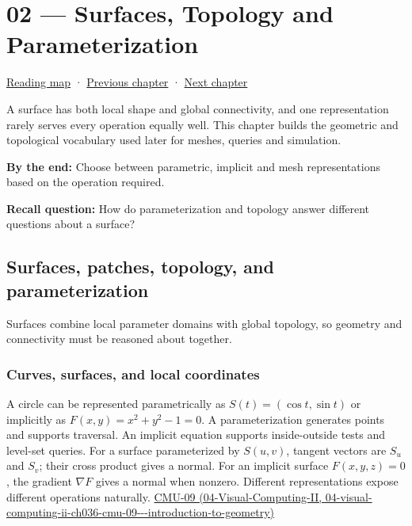 \hypertarget{03-visual-computing-i-ch002}{}
\chapter{02 --- Surfaces, Topology and Parameterization}\label{03-visual-computing-i-ch002-surfaces-topology-and-parameterization}

\hyperref[volume-reading-map]{Reading map} · \hyperref[03-visual-computing-i-ch001-from-worlds-to-images-and-inference]{Previous chapter} · \hyperref[03-visual-computing-i-ch003-lens-optics-and-image-formation]{Next chapter}

A surface has both local shape and global connectivity, and one representation rarely serves every operation equally well. This chapter builds the geometric and topological vocabulary used later for meshes, queries and simulation.

\textbf{By the end:} Choose between parametric, implicit and mesh representations based on the operation required.

\textbf{Recall question:} How do parameterization and topology answer different questions about a surface?

\section{Surfaces, patches, topology, and parameterization}\label{03-visual-computing-i-ch002-surfaces-patches-topology-and-parameterization}

Surfaces combine local parameter domains with global topology, so geometry and connectivity must be reasoned about together.

\subsection{Curves, surfaces, and local coordinates}\label{03-visual-computing-i-ch002-curves-surfaces-and-local-coordinates}

A circle can be represented parametrically as \(S(t)=(\cos t,\sin t)\) or implicitly as \(F(x,y)=x^2+y^2-1=0\). A parameterization generates points and supports traversal. An implicit equation supports inside-outside tests and level-set queries. For a surface parameterized by \(S(u,v)\), tangent vectors are \(S_u\) and \(S_v\); their cross product gives a normal. For an implicit surface \(F(x,y,z)=0\), the gradient \(\nabla F\) gives a normal when nonzero. Different representations expose different operations naturally. \href{../04-Visual-Computing-II/main.pdf\#nameddest=04-visual-computing-ii-ch036-cmu-09---introduction-to-geometry}{CMU-09 (04-Visual-Computing-II, 04-visual-computing-ii-ch036-cmu-09-\/-\/-introduction-to-geometry)}

